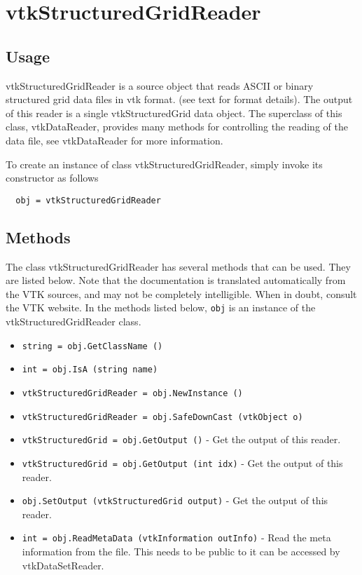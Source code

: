 \section{vtkStructuredGridReader}

\subsection{Usage}

 vtkStructuredGridReader is a source object that reads ASCII or binary 
 structured grid data files in vtk format. (see text for format details).
 The output of this reader is a single vtkStructuredGrid data object.
 The superclass of this class, vtkDataReader, provides many methods for
 controlling the reading of the data file, see vtkDataReader for more
 information.

To create an instance of class vtkStructuredGridReader, simply
invoke its constructor as follows
\begin{verbatim}
  obj = vtkStructuredGridReader
\end{verbatim}
\subsection{Methods}

The class vtkStructuredGridReader has several methods that can be used.
  They are listed below.
Note that the documentation is translated automatically from the VTK sources,
and may not be completely intelligible.  When in doubt, consult the VTK website.
In the methods listed below, \verb|obj| is an instance of the vtkStructuredGridReader class.
\begin{itemize}
\item  \verb|string = obj.GetClassName ()|

\item  \verb|int = obj.IsA (string name)|

\item  \verb|vtkStructuredGridReader = obj.NewInstance ()|

\item  \verb|vtkStructuredGridReader = obj.SafeDownCast (vtkObject o)|

\item  \verb|vtkStructuredGrid = obj.GetOutput ()| -  Get the output of this reader.

\item  \verb|vtkStructuredGrid = obj.GetOutput (int idx)| -  Get the output of this reader.

\item  \verb|obj.SetOutput (vtkStructuredGrid output)| -  Get the output of this reader.

\item  \verb|int = obj.ReadMetaData (vtkInformation outInfo)| -  Read the meta information from the file.  This needs to be public to it
 can be accessed by vtkDataSetReader.

\end{itemize}
